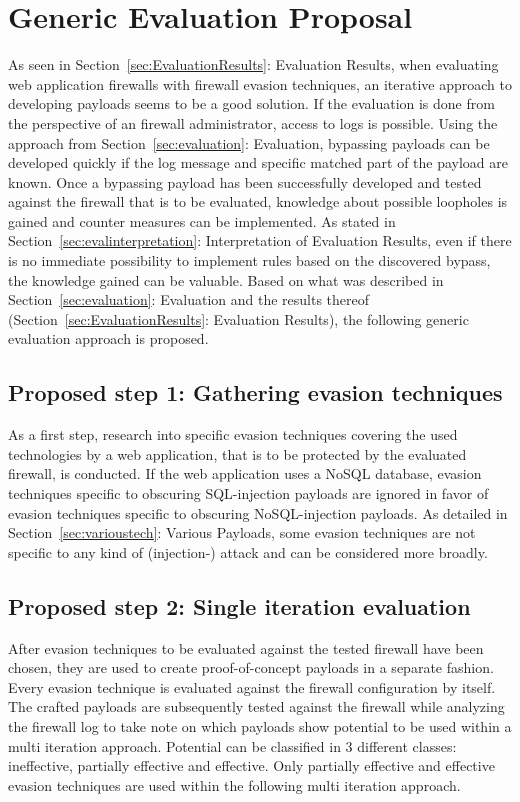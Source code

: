 \section{Generic Evaluation Proposal}
\label{sec:proposal}
As seen in Section~\ref{sec:EvaluationResults}: Evaluation Results, when evaluating web application firewalls with firewall evasion techniques, an iterative approach to developing payloads seems to be a good solution. If the evaluation is done from the perspective of an firewall administrator, access to logs is possible. Using the approach from Section~\ref{sec:evaluation}: Evaluation, bypassing payloads can be developed quickly if the log message and specific matched part of the payload are known.
Once a bypassing payload has been successfully developed and tested against the firewall that is to be evaluated, knowledge about possible loopholes is gained and counter measures can be implemented. As stated in Section~\ref{sec:evalinterpretation}: Interpretation of Evaluation Results, even if there is no immediate possibility to implement rules based on the discovered bypass, the knowledge gained can be valuable. Based on what was described in Section~\ref{sec:evaluation}: Evaluation and the results thereof (Section~\ref{sec:EvaluationResults}: Evaluation Results), the following generic evaluation approach is proposed.

\subsection{Proposed step 1: Gathering evasion techniques}
As a first step, research into specific evasion techniques covering the used technologies by a web application, that is to be protected by the evaluated firewall, is conducted. If the web application uses a NoSQL database, evasion techniques specific to obscuring SQL-injection payloads are ignored in favor of evasion techniques specific to obscuring NoSQL-injection payloads. As detailed in Section~\ref{sec:varioustech}: Various Payloads, some evasion techniques are not specific to any kind of (injection-) attack and can be considered more broadly.

\subsection{Proposed step 2: Single iteration evaluation}
After evasion techniques to be evaluated against the tested firewall have been chosen, they are used to create proof-of-concept payloads in a separate fashion. Every evasion technique is evaluated against the firewall configuration by itself. The crafted payloads are subsequently tested against the firewall while analyzing the firewall log to take note on which payloads show potential to be used within a multi iteration approach. Potential can be classified in 3 different classes: ineffective, partially effective and effective. Only partially effective and effective evasion techniques are used within the following multi iteration approach.

